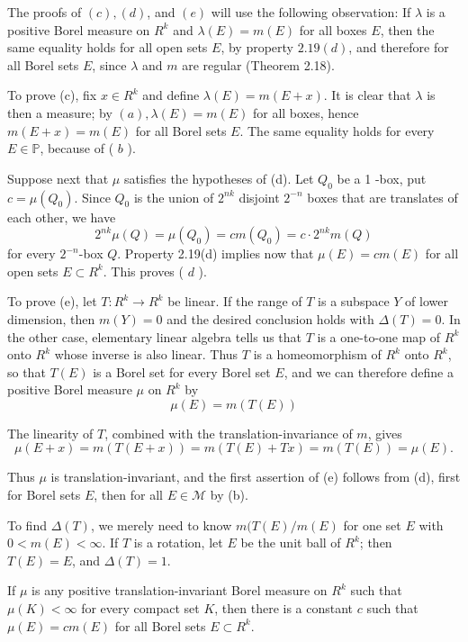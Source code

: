 \documentclass[12pt, a4paper, oneside]{book}
\begin{document}
\begin{theorem}
    The proofs of $(c),(d)$, and $(e)$ will use the following observation: If $\lambda$ is a positive Borel measure on $R^{k}$ and $\lambda(E)=m(E)$ for all boxes $E$, then the same equality holds for all open sets $E$, by property $2.19(d)$, and therefore for all Borel sets $E$, since $\lambda$ and $m$ are regular (Theorem 2.18).

    To prove (c), fix $x \in R^{k}$ and define $\lambda(E)=m(E+x)$. It is clear that $\lambda$ is then a measure; by $(a), \lambda(E)=m(E)$ for all boxes, hence $m(E+x)=m(E)$ for all Borel sets $E$. The same equality holds for every $E \in \mathbb{P}$, because of ( $b$ ).

    Suppose next that $\mu$ satisfies the hypotheses of (d). Let $Q_{0}$ be a 1 -box, put $c=\mu\left(Q_{0}\right)$. Since $Q_{0}$ is the union of $2^{n k}$ disjoint $2^{-n}$ boxes that are translates of each other, we have
    $$
        2^{n k} \mu(Q)=\mu\left(Q_{0}\right)=c m\left(Q_{0}\right)=c \cdot 2^{n k} m(Q)
    $$
    for every $2^{-n}$-box $Q$. Property 2.19(d) implies now that $\mu(E)=c m(E)$ for all open sets $E \subset R^{k}$. This proves ( $d$ ).

    To prove (e), let $T: R^{k} \rightarrow R^{k}$ be linear. If the range of $T$ is a subspace $Y$ of lower dimension, then $m(Y)=0$ and the desired conclusion holds with $\Delta(T)=0$. In the other case, elementary linear algebra tells us that $T$ is a one-to-one map of $R^{k}$ onto $R^{k}$ whose inverse is also linear. Thus $T$ is a homeomorphism of $R^{k}$ onto $R^{k}$, so that $T(E)$ is a Borel set for every Borel set $E$, and we can therefore define a positive Borel measure $\mu$ on $R^{k}$ by
    $$
        \mu(E)=m(T(E))
    $$

    The linearity of $T$, combined with the translation-invariance of $m$, gives
    $$
        \mu(E+x)=m(T(E+x))=m(T(E)+T x)=m(T(E))=\mu(E) .
    $$

    Thus $\mu$ is translation-invariant, and the first assertion of (e) follows from (d), first for Borel sets $E$, then for all $E \in \mathcal{M}$ by (b).

    To find $\Delta(T)$, we merely need to know $m(T(E) / m(E)$ for one set $E$ with $0<m(E)<\infty$. If $T$ is a rotation, let $E$ be the unit ball of $R^{k}$; then $T(E)=E$, and $\Delta(T)=1$.
\end{theorem}

\begin{theorem}
    If $\mu$ is any positive translation-invariant Borel measure on $R^{k}$ such that $\mu(K)<\infty$ for every compact set $K$, then there is a constant $c$ such that $\mu(E)=cm(E)$ for all Borel sets $E \subset R^{k}$.
\end{theorem}
\end{document}
